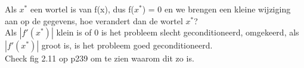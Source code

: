 Als $x^*$ een wortel is van f(x), dus f($x^*$) = 0 en we brengen een kleine wijziging aan op de gegevens, hoe verandert dan de wortel $x^*$?\\
Als $|f'(x^*)|$ klein is of 0 is het probleem slecht geconditioneerd, omgekeerd, als $|f'(x^*)|$ groot is, is het probleem goed geconditioneerd.\\
Check fig 2.11 op p239 om te zien waarom dit zo is.
